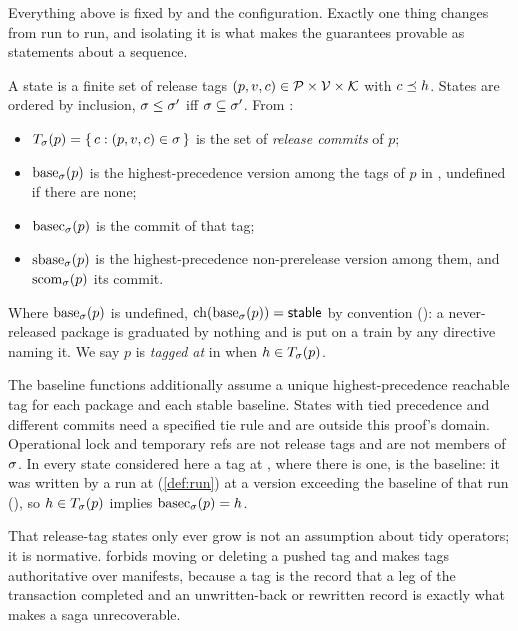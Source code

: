 Everything above is fixed by \Head{} and the configuration. Exactly one thing
changes from run to run, and isolating it is what makes the guarantees provable
as statements about a sequence.

\begin{definition}
\label{def:state}
A state \st{} is a finite set of release tags $(p, v, c) \in \mathcal{P} \times \mathcal{V}
\times \mathcal{K}$ with $c \preceq h$. States are ordered by inclusion,
$\sigma \leq \sigma'$ iff $\sigma \subseteq \sigma'$. From \st{}:
\begin{itemize}
  \item $T_{\sigma}(p) = \{\,c : (p,v,c) \in \sigma\,\}$ is the set of
    \emph{release commits} of $p$;
  \item $\mathrm{base}_{\sigma}(p)$ is the highest-precedence version among the tags of $p$
    in \st{}, undefined if there are none;
  \item $\mathrm{basec}_{\sigma}(p)$ is the commit of that tag;
  \item $\mathrm{sbase}_{\sigma}(p)$ is the highest-precedence non-prerelease version among
    them, and $\mathrm{scom}_{\sigma}(p)$ its commit.
\end{itemize}
Where $\mathrm{base}_{\sigma}(p)$ is undefined, $\mathrm{ch}(\mathrm{base}_{\sigma}(p)) = \mathsf{stable}$ by
convention (): a never-released package is graduated by nothing and
is put on a train by any directive naming it. We say $p$ is \emph{tagged at
\Head} in \st{} when $h \in T_{\sigma}(p)$.
\end{definition}

The baseline functions additionally assume a unique highest-precedence
reachable tag for each package and each stable baseline. States with tied
precedence and different commits need a specified tie rule and are outside
this proof's domain. Operational lock and temporary refs are not release tags
and are not members of $\sigma$. In every state considered here a tag at \Head{},
where there is one, is the baseline: it was written by a run at \Head{}
(\cref{def:run}) at a version exceeding the baseline of that run
(), so $h \in T_{\sigma}(p)$ implies $\mathrm{basec}_{\sigma}(p) = h$.

That release-tag states only ever grow is not an assumption about tidy operators; it is
normative.  forbids moving or deleting a pushed tag and 
makes tags authoritative over manifests, because a tag is the record that a leg
of the transaction completed and an unwritten-back or rewritten record is
exactly what makes a saga unrecoverable.

